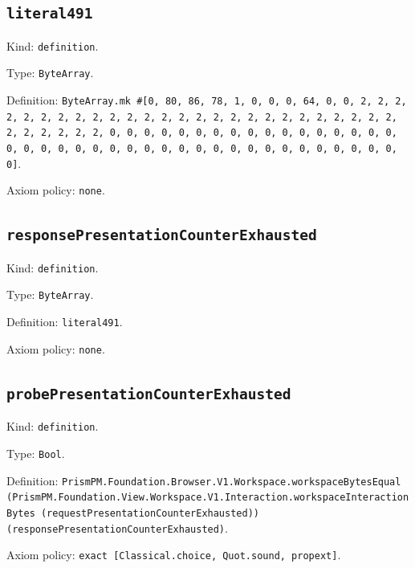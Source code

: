 \documentclass[11pt]{article}
\begin{document}
\subsection*{\texttt{literal491}}
\noindent Kind: \texttt{definition}.\par
\noindent Type: \texttt{ByteArray}.\par
\noindent Definition: \texttt{ByteArray.mk \#[0, 80, 86, 78, 1, 0, 0, 0, 64, 0, 0, 2, 2, 2, 2, 2, 2, 2, 2, 2, 2, 2, 2, 2, 2, 2, 2, 2, 2, 2, 2, 2, 2, 2, 2, 2, 2, 2, 2, 2, 2, 2, 2, 0, 0, 0, 0, 0, 0, 0, 0, 0, 0, 0, 0, 0, 0, 0, 0, 0, 0, 0, 0, 0, 0, 0, 0, 0, 0, 0, 0, 0, 0, 0, 0, 0, 0, 0, 0, 0, 0, 0, 0, 0]}.\par
\noindent Axiom policy: \texttt{none}.\par
\subsection*{\texttt{responsePresentationCounterExhausted}}
\noindent Kind: \texttt{definition}.\par
\noindent Type: \texttt{ByteArray}.\par
\noindent Definition: \texttt{literal491}.\par
\noindent Axiom policy: \texttt{none}.\par
\subsection*{\texttt{probePresentationCounterExhausted}}
\noindent Kind: \texttt{definition}.\par
\noindent Type: \texttt{Bool}.\par
\noindent Definition: \texttt{PrismPM.Foundation.Browser.V1.Workspace.workspaceBytesEqual (PrismPM.Foundation.View.Workspace.V1.Interaction.workspaceInteractionBytes (requestPresentationCounterExhausted)) (responsePresentationCounterExhausted)}.\par
\noindent Axiom policy: \texttt{exact [Classical.choice, Quot.sound, propext]}.\par
\end{document}
